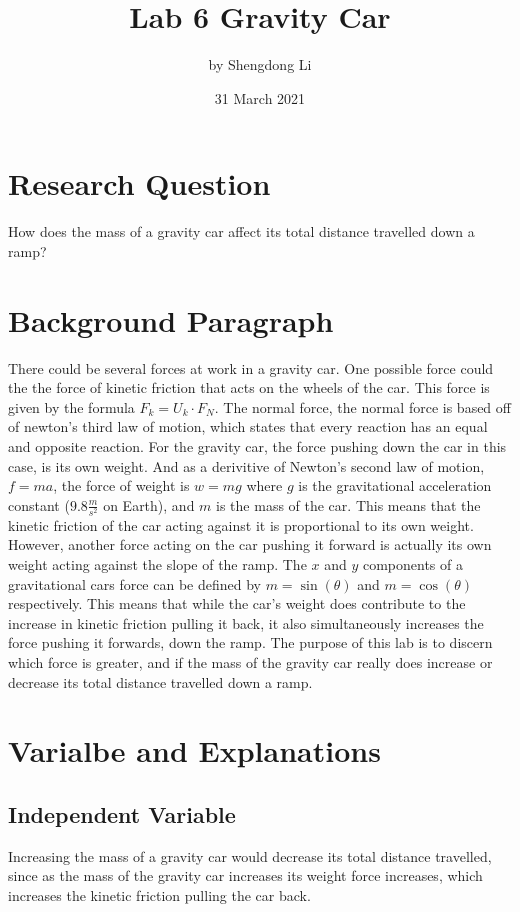 \documentclass[12pt]{article}
\begin{document}
\title{Lab 6 Gravity Car}
\author{by Shengdong Li}
\date{31 March 2021}
\maketitle

\section{Research Question}

How does the mass of a gravity car affect its total distance travelled down a ramp? 

\section{Background Paragraph}

There could be several forces at work in a gravity car. One possible force could the the force of kinetic friction that acts on the wheels of the car. This force is given by the formula \(F_k=U_k\cdot F_N\). The normal force, the normal force is based off of newton's third law of motion, which states that every reaction has an equal and opposite reaction. For the gravity car, the force pushing down the car in this case, is its own weight. And as a derivitive of Newton's second law of motion, \(f=ma\), the force of weight is \(w=mg\) where \(g\) is the gravitational acceleration constant (\(9.8\frac{m}{s^2}\) on Earth), and \(m\) is the mass of the car. This means that the kinetic friction of the car acting against it is proportional to its own weight. However, another force acting on the car pushing it forward is actually its own weight acting against the slope of the ramp. The \(x\) and \(y\) components of a gravitational cars force can be defined by \(m=\sin(\theta)\) and \(m=\cos(\theta)\) respectively. This means that while the car's weight does contribute to the increase in kinetic friction pulling it back, it also simultaneously increases the force pushing it forwards, down the ramp. The purpose of this lab is to discern which force is greater, and if the mass of the gravity car really does increase or decrease its total distance travelled down a ramp.

\section{Varialbe and Explanations}

\subsection{Independent Variable} Increasing the mass of a gravity car would decrease its total distance travelled, since as the mass of the gravity car increases its weight force increases, which increases the kinetic friction pulling the car back.
\end{document}
